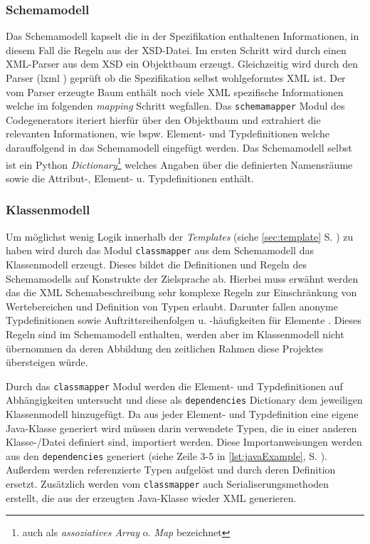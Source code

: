 \subsubsection{Schemamodell}
\label{sec:schemamodel}

Das Schemamodell kapselt die in der Spezifikation enthaltenen Informationen, in diesem Fall die Regeln aus der \gls{XSD}-Datei. Im ersten Schritt wird durch einen XML-Parser aus dem \gls{XSD} ein Objektbaum erzeugt. Gleichzeitig wird durch den Parser (lxml \cite{lxml}) geprüft ob die Spezifikation selbst wohlgeformtes \gls{XML} ist.
Der vom Parser erzeugte Baum enthält noch viele \gls{XML} spezifische Informationen welche im folgenden \emph{mapping} Schritt wegfallen. Das \texttt{schemamapper} Modul des Codegenerators iteriert hierfür über den Objektbaum und extrahiert die relevanten Informationen, wie bspw. Element- und Typdefinitionen welche darauffolgend in das Schemamodell eingefügt werden. Das Schemamodell selbst ist ein Python \emph{Dictionary}\footnote{auch als \emph{assoziatives Array} o. \emph{Map} bezeichnet} welches Angaben über die definierten Namensräume sowie die Attribut-, Element- u. Typdefinitionen enthält.

\subsubsection{Klassenmodell}
\label{sec:classmodel}

Um möglichst wenig Logik innerhalb der \emph{Templates} (siehe \cref{sec:template} S. \pageref{sec:template}) zu haben wird durch das Modul \texttt{classmapper} aus dem Schemamodell das Klassenmodell erzeugt. Dieses bildet die Definitionen und Regeln des Schemamodells auf Konstrukte der Zielsprache ab. Hierbei muss erwähnt werden das die XML Schemabeschreibung sehr komplexe Regeln zur Einschränkung von Wertebereichen und Definition von Typen erlaubt. Darunter fallen anonyme Typdefinitionen sowie Auftrittsreihenfolgen u. -häufigkeiten für Elemente \cite{XMLschema}. Dieses Regeln sind im Schemamodell enthalten, werden aber im Klassenmodell nicht übernommen da deren Abbildung den zeitlichen Rahmen diese Projektes übersteigen würde.

Durch das \texttt{classmapper} Modul werden die Element- und Typdefinitionen auf Abhängigkeiten untersucht und diese als \texttt{dependencies} Dictionary dem jeweiligen Klassenmodell hinzugefügt. Da aus jeder Element- und Typdefinition eine eigene Java-Klasse generiert wird müssen darin verwendete Typen, die in einer anderen Klasse-/Datei definiert sind, importiert werden. Diese Importanweisungen werden aus den \texttt{dependencies} generiert (siehe Zeile 3-5 in \cref{lst:javaExample}, S. \pageref{lst:javaExample}).
Außerdem werden referenzierte Typen aufgelöst und durch deren Definition ersetzt. Zusätzlich werden vom \texttt{classmapper} auch Serialiserungsmethoden erstellt, die aus der erzeugten Java-Klasse wieder \gls{XML} generieren.

